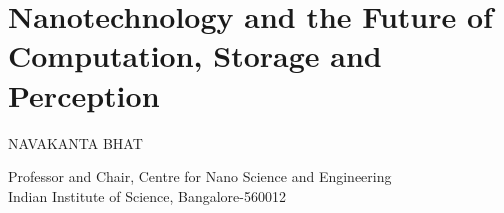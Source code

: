 \chapter{Nanotechnology and the Future of Computation, Storage and Perception}

\begin{center}
{\large\uppercase{Navakanta Bhat}}

\vskip -6pt

Professor and Chair, Centre for Nano Science and Engineering\\ Indian Institute of Science, Bangalore-560012
\end{center}


\newpage


